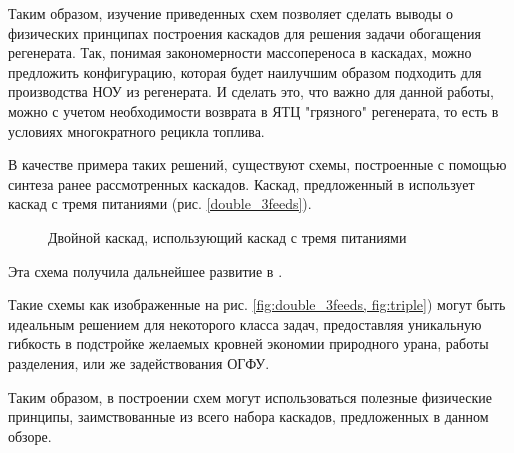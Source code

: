Таким образом, изучение приведенных схем позволяет сделать выводы о физических принципах построения каскадов для решения задачи обогащения регенерата. 
Так, понимая закономерности массопереноса в каскадах, можно предложить конфигурацию, которая будет наилучшим образом подходить для производства НОУ из регенерата.
И сделать это, что важно для данной работы, можно с учетом необходимости возврата в ЯТЦ "грязного" регенерата, то есть в условиях многократного рецикла топлива.

В качестве примера таких решений, существуют схемы, построенные с помощью синтеза ранее рассмотренных каскадов.
Каскад, предложенный в \cite{smirnovDilutionRecycledUranium2015} использует каскад с тремя питаниями  (рис. \ref{double_3feeds}).
\begin{figure}[ht]
  \caption{Двойной каскад, использующий каскад с тремя питаниями}\label{fig:double_3feeds}
\end{figure}

Эта схема получила дальнейшее развитие в \cite{smirnovEvaluatingEffectivenessDilution2016}.

Такие схемы как изображенные на рис. \ref{fig:double_3feeds, fig:triple}) могут быть идеальным решением для некоторого класса задач, предоставляя уникальную гибкость в подстройке желаемых кровней экономии природного урана, работы разделения, или же задействования ОГФУ.

Таким образом, в построении схем могут использоваться полезные физические принципы, заимствованные из всего набора каскадов, предложенных в данном обзоре.

